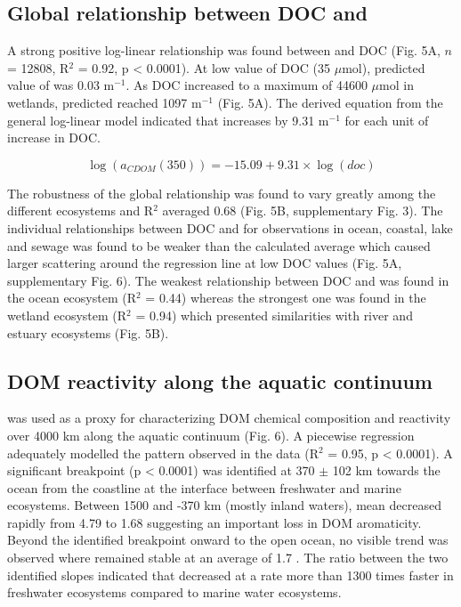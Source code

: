 \subsection*{Global relationship between DOC and }

A strong positive log-linear relationship was found between  and DOC (Fig. 5A, $n$ = 12808, R$^2$ = 0.92, p < 0.0001). At low value of DOC (35 $\mu$mol), predicted value of  was 0.03 m$^{-1}$. As DOC increased to a maximum of 44600 $\mu$mol in wetlands, predicted  reached 1097 m$^{-1}$ (Fig. 5A). The derived equation from the general log-linear model indicated that  increases by 9.31 m$^{-1}$ for each unit of increase in DOC.

\begin{equation}
  \log(a_{CDOM}(350)) = -15.09 + 9.31 \times \log(doc)
\end{equation}

The robustness of the global relationship was found to vary greatly among the different ecosystems and R$^2$ averaged 0.68 (Fig. 5B, supplementary Fig. 3). The individual relationships between DOC and  for observations in ocean, coastal, lake and sewage was found to be weaker than the calculated average which caused larger scattering around the regression line at low DOC values (Fig. 5A, supplementary Fig. 6). The weakest relationship between DOC and  was found in the ocean ecosystem (R$^2$ = 0.44) whereas the strongest one was found in the wetland ecosystem (R$^2$ = 0.94) which presented similarities with river and estuary ecosystems (Fig. 5B).

\subsection*{DOM reactivity along the aquatic continuum}

 was used as a proxy for characterizing DOM chemical composition and reactivity \citep{Weishaar2003} over 4000 km along the aquatic continuum (Fig. 6). A piecewise regression adequately modelled the pattern observed in the data (R$^2$ = 0.95, p < 0.0001). A significant breakpoint (p < 0.0001) was identified at 370 $\pm$ 102 km towards the ocean from the coastline at the interface between freshwater and marine ecosystems. Between 1500 and -370 km (mostly inland waters), mean  decreased rapidly from 4.79 to 1.68 \suvagram suggesting an important loss in DOM aromaticity. Beyond the identified breakpoint onward to the open ocean, no visible trend was observed where  remained stable at an average of 1.7 \suvagram. The ratio between the two identified slopes indicated that  decreased at a rate more than 1300 times faster in freshwater ecosystems compared to marine water ecosystems.

